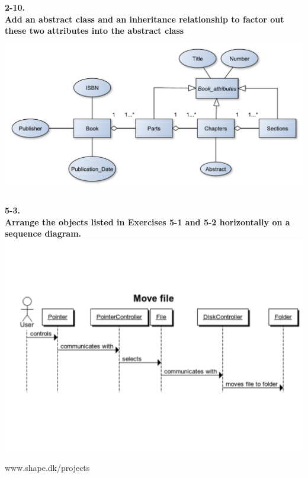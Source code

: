 \documentclass[12pt]{article}
\begin{document}
\textbf{2-10.}\\
\textbf{Add an abstract class and an inheritance relationship to factor out these two attributes into the abstract class}\\

\includegraphics[height=70mm]{2-10}

\newpage
\textbf{5-3.}\\
\textbf{Arrange the objects listed in Exercises 5-1 and 5-2 horizontally on a sequence diagram.}\\
\includegraphics[scale=0.5]{5-3}









\newpage

\begin{thebibliography}{9}

  www.shape.dk/projects

\end{thebibliography}
\end{document}
